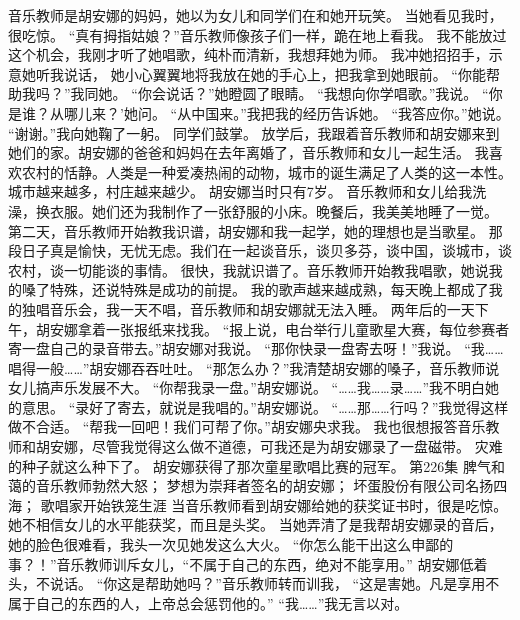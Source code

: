 \documentclass[a4paper,12pt,UTF8,twoside]{ctexbook}
\begin{document}
        音乐教师是胡安娜的妈妈，她以为女儿和同学们在和她开玩笑。 
        当她看见我时，很吃惊。 
        “真有拇指姑娘？”音乐教师像孩子们一样，跪在地上看我。 
        我不能放过这个机会，我刚才听了她唱歌，纯朴而清新，我想拜她为师。 
        我冲她招招手，示意她听我说话， 
        她小心翼翼地将我放在她的手心上，把我拿到她眼前。 
        “你能帮助我吗？”我同她。 
        “你会说话？”她瞪圆了眼睛。 
        “我想向你学唱歌。”我说。 
        “你是谁？从哪儿来？’她问。 
        “从中国来。”我把我的经历告诉她。 
        “我答应你。”她说。 
        “谢谢。”我向她鞠了一躬。 
        同学们鼓掌。 
        放学后，我跟着音乐教师和胡安娜来到她们的家。胡安娜的爸爸和妈妈在去年离婚了，音乐教师和女儿一起生活。 
        我喜欢农村的恬静。人类是一种爱凑热闹的动物，城市的诞生满足了人类的这一本性。城市越来越多，村庄越来越少。 
        胡安娜当时只有7岁。 
        音乐教师和女儿给我洗澡，换衣服。她们还为我制作了一张舒服的小床。晚餐后，我美美地睡了一觉。 
        第二天，音乐教师开始教我识谱，胡安娜和我一起学，她的理想也是当歌星。 
        那段日子真是愉快，无忧无虑。我们在一起谈音乐，谈贝多芬，谈中国，谈城市，谈农村，谈一切能谈的事情。 
        很快，我就识谱了。音乐教师开始教我唱歌，她说我的嗓了特殊，还说特殊是成功的前提。 
        我的歌声越来越成熟，每天晚上都成了我的独唱音乐会，我一天不唱，音乐教师和胡安娜就无法入睡。 
        两年后的一天下午，胡安娜拿着一张报纸来找我。 
        “报上说，电台举行儿童歌星大赛，每位参赛者寄一盘自己的录音带去。”胡安娜对我说。 
        “那你快录一盘寄去呀！”我说。 
        “我……唱得一般……”胡安娜吞吞吐吐。 
        “那怎么办？”我清楚胡安娜的嗓子，音乐教师说女儿搞声乐发展不大。 
        “你帮我录一盘。”胡安娜说。 
        “……我……录……”我不明白她的意思。 
        “录好了寄去，就说是我唱的。”胡安娜说。 
        “……那……行吗？”我觉得这样做不合适。 
        “帮我一回吧！我们可帮了你。”胡安娜央求我。 
        我也很想报答音乐教师和胡安娜，尽管我觉得这么做不道德，可我还是为胡安娜录了一盘磁带。 
        灾难的种子就这么种下了。 
        胡安娜获得了那次童星歌唱比赛的冠军。   第226集 
        脾气和蔼的音乐教师勃然大怒； 
        梦想为崇拜者签名的胡安娜； 
        坏蛋股份有限公司名扬四海； 
        歌唱家开始铁笼生涯   
        当音乐教师看到胡安娜给她的获奖证书时，很是吃惊。她不相信女儿的水平能获奖，而且是头奖。 
        当她弄清了是我帮胡安娜录的音后，她的脸色很难看，我头一次见她发这么大火。 
        “你怎么能干出这么申鄙的事？！”音乐教师训斥女儿，“不属于自己的东西，绝对不能享用。” 
        胡安娜低着头，不说话。 
        “你这是帮助她吗？”音乐教师转而训我，  “这是害她。凡是享用不属于自己的东西的人，上帝总会惩罚他的。” 
        “我……”我无言以对。 
\end{document}
